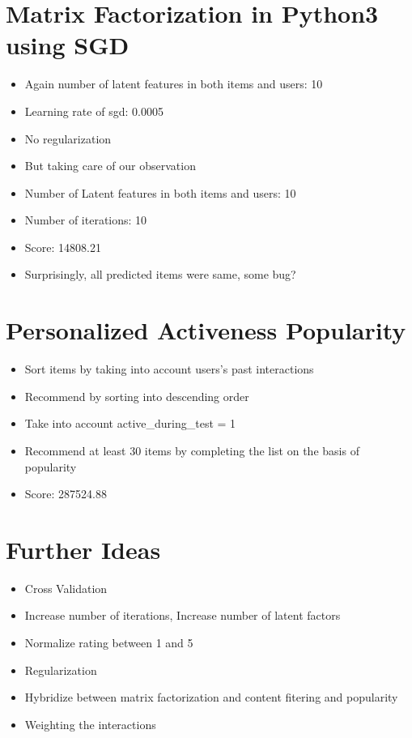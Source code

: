 \documentclass{article}
\begin{document}
\section{Matrix Factorization in Python3 using SGD}
\begin{itemize}
\item Again number of latent features in both items and users: 10
\item Learning rate of sgd: 0.0005
\item No regularization
\item But taking care of our observation
 \item Number of Latent features in both items and users: 10
 \item Number of iterations: 10 
 \item Score: 14808.21
 \item Surprisingly, all predicted items were same, some bug?
\end{itemize}


\section{Personalized Activeness Popularity}
\begin{itemize}
 \item Sort items by taking into account users's past interactions
 \item Recommend by sorting into descending order
 \item Take into account active\_during\_test = 1
 \item Recommend at least 30 items by completing the list on the basis of popularity
 \item Score: 287524.88
\end{itemize}

 \section{Further Ideas}
 \begin{itemize}
  \item Cross Validation
  \item Increase number of iterations, Increase number of latent factors
  \item Normalize rating between 1 and 5
  \item Regularization
  \item Hybridize between matrix factorization and content fitering and popularity
  \item Weighting the interactions
 \end{itemize}

\end{document}
